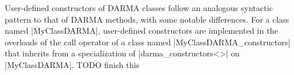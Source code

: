 User-defined constructors of DARMA classes follow an analogous syntactic pattern
to that of DARMA methods, with some notable differences.  For a class named
|MyClassDARMA|, user-defined constructors are implemented in the overloads
of the call operator of a class named |MyClassDARMA_constructors| that inherits
from a specialization of |darma_constructors<>| on |MyClassDARMA|.
TODO finish this

\lstDeleteShortInline{\|}

 








